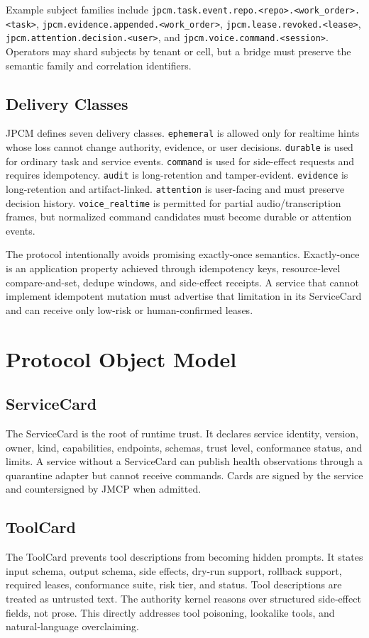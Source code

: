 \documentclass[10pt,journal,onecolumn]{IEEEtran}
\begin{document}
Example subject families include \texttt{jpcm.task.event.repo.<repo>.<work\_order>.<task>}, \texttt{jpcm.evidence.appended.<work\_order>}, \texttt{jpcm.lease.revoked.<lease>}, \texttt{jpcm.attention.decision.<user>}, and \texttt{jpcm.voice.command.<session>}. Operators may shard subjects by tenant or cell, but a bridge must preserve the semantic family and correlation identifiers.

\subsection{Delivery Classes}
JPCM defines seven delivery classes. \texttt{ephemeral} is allowed only for realtime hints whose loss cannot change authority, evidence, or user decisions. \texttt{durable} is used for ordinary task and service events. \texttt{command} is used for side-effect requests and requires idempotency. \texttt{audit} is long-retention and tamper-evident. \texttt{evidence} is long-retention and artifact-linked. \texttt{attention} is user-facing and must preserve decision history. \texttt{voice\_realtime} is permitted for partial audio/transcription frames, but normalized command candidates must become durable or attention events.

The protocol intentionally avoids promising exactly-once semantics. Exactly-once is an application property achieved through idempotency keys, resource-level compare-and-set, dedupe windows, and side-effect receipts. A service that cannot implement idempotent mutation must advertise that limitation in its ServiceCard and can receive only low-risk or human-confirmed leases.

\section{Protocol Object Model}
\subsection{ServiceCard}
The ServiceCard is the root of runtime trust. It declares service identity, version, owner, kind, capabilities, endpoints, schemas, trust level, conformance status, and limits. A service without a ServiceCard can publish health observations through a quarantine adapter but cannot receive commands. Cards are signed by the service and countersigned by JMCP when admitted.

\subsection{ToolCard}
The ToolCard prevents tool descriptions from becoming hidden prompts. It states input schema, output schema, side effects, dry-run support, rollback support, required leases, conformance suite, risk tier, and status. Tool descriptions are treated as untrusted text. The authority kernel reasons over structured side-effect fields, not prose. This directly addresses tool poisoning, lookalike tools, and natural-language overclaiming.
\end{document}
